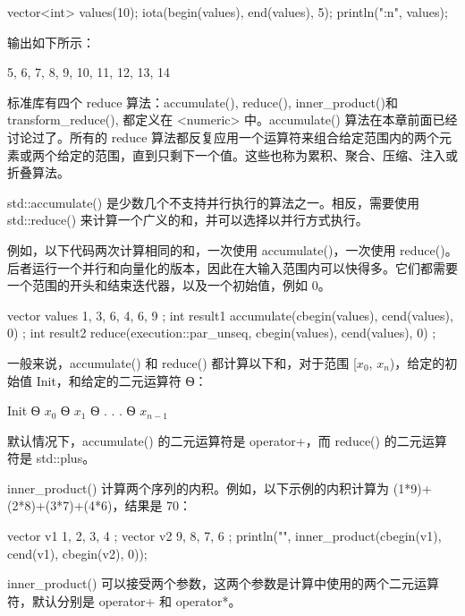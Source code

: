 \begin{cpp}
vector<int> values(10);
iota(begin(values), end(values), 5);
println("{:n}", values);
\end{cpp}

输出如下所示：

\begin{shell}
5, 6, 7, 8, 9, 10, 11, 12, 13, 14
\end{shell}


标准库有四个 reduce 算法：accumulate(), reduce(), inner\_product()和 transform\_reduce(), 都定义在 <numeric> 中。accumulate() 算法在本章前面已经讨论过了。所有的 reduce 算法都反复应用一个运算符来组合给定范围内的两个元素或两个给定的范围，直到只剩下一个值。这些也称为累积、聚合、压缩、注入或折叠算法。


std::accumulate() 是少数几个不支持并行执行的算法之一。相反，需要使用 std::reduce() 来计算一个广义的和，并可以选择以并行方式执行。

例如，以下代码两次计算相同的和，一次使用 accumulate()，一次使用 reduce()。后者运行一个并行和向量化的版本，因此在大输入范围内可以快得多。它们都需要一个范围的开头和结束迭代器，以及一个初始值，例如 0。

\begin{cpp}
vector values { 1, 3, 6, 4, 6, 9 };
int result1 { accumulate(cbegin(values), cend(values), 0) };
int result2 { reduce(execution::par_unseq, cbegin(values), cend(values), 0) };
\end{cpp}

一般来说，accumulate() 和 reduce() 都计算以下和，对于范围 [$x_0$, $x_{n}$)，给定的初始值 Init，和给定的二元运算符 Ѳ：

Init Ѳ $x_0$ Ѳ $x_1$ Ѳ . . . Ѳ $x_{n−1}$

默认情况下，accumulate() 的二元运算符是 operator+，而 reduce() 的二元运算符是 std::plus。


inner\_product() 计算两个序列的内积。例如，以下示例的内积计算为 (1*9)+(2*8)+(3*7)+(4*6)，结果是 70：

\begin{cpp}
vector v1 { 1, 2, 3, 4 };
vector v2 { 9, 8, 7, 6 };
println("{}", inner_product(cbegin(v1), cend(v1), cbegin(v2), 0));
\end{cpp}

inner\_product() 可以接受两个参数，这两个参数是计算中使用的两个二元运算符，默认分别是 operator+ 和 operator*。

